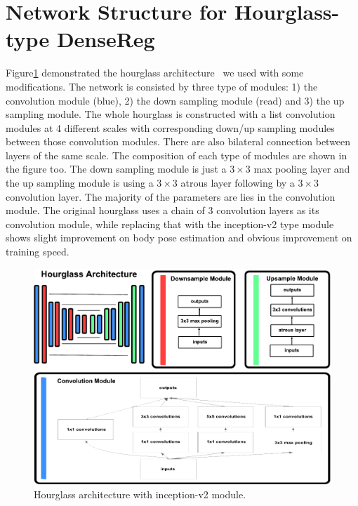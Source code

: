 \section{Network Structure for Hourglass-type DenseReg}

Figure\ref{fig:hourglass_arch} demonstrated the hourglass architecture~\cite{newell2016stacked} we used with some modifications. The network is consisted by three type of modules: 1) the convolution module (blue), 2) the down sampling module (read) and 3) the up sampling module. The whole hourglass is constructed with a list convolution modules at 4 different scales with corresponding down/up sampling modules between those convolution modules. There are also bilateral connection between layers of the same scale. The composition of each type of modules are shown in the figure too. The down sampling module is just a $3\times3$ max pooling layer and the up sampling module is using a $3\times3$ atrous layer following by a $3\times3$ convolution layer. The majority of the parameters are lies in the convolution module. The original hourglass uses a chain of 3 convolution layers as its convolution module, while replacing that with the inception-v2 type module shows slight improvement on body pose estimation and obvious improvement on training speed.

\begin{figure}[ht]
\centering
\includegraphics[width=\linewidth]{resources/Human_Poses/hourglass_archietecture}
\caption{Hourglass architecture with inception-v2 module.}
\label{fig:hourglass_arch}

\end{figure}

